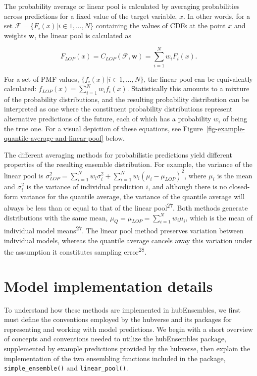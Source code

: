 \documentclass[
  letterpaper,
  DIV=11,
  numbers=noendperiod]{scrartcl}
\begin{document}
The probability average or linear pool is calculated by averaging
probabilities across predictions for a fixed value of the target
variable, \(x\). In other words, for a set
\(\mathcal{F} = \{F_i(x)| i \in 1,...,N \}\) containing the values of
CDFs at the point \(x\) and weights \(\pmb{w}\), the linear pool is
calculated as

\[
F_{LOP}(x) = C_{LOP}(\mathcal{F}, \pmb{w}) = \sum_{i = 1}^Nw_iF_i(x). 
\]

For a set of PMF values, \(\{f_i(x)|i \in 1, ..., N\}\), the linear pool
can be equivalently calculated:
\(f_{LOP}(x) = \sum_{i = 1}^N w_i f_i(x)\). Statistically this amounts
to a mixture of the probability distributions, and the resulting
probability distribution can be interpreted as one where the constituent
probability distributions represent alternative predictions of the
future, each of which has a probability \(w_i\) of being the true one.
For a visual depiction of these equations, see
Figure~\ref{fig-example-quantile-average-and-linear-pool} below.

The different averaging methods for probabilistic predictions yield
different properties of the resulting ensemble distribution. For
example, the variance of the linear pool is
\(\sigma^2_{LOP} = \sum_{i=1}^Nw_i\sigma_i^2 + \sum_{i=1}^Nw_i(\mu_i-\mu_{LOP})^2\),
where \(\mu_i\) is the mean and \(\sigma^2_i\) is the variance of
individual prediction \(i\), and although there is no closed-form
variance for the quantile average, the variance of the quantile average
will always be less than or equal to that of the linear
pool\textsuperscript{27}. Both methods generate distributions with the
same mean, \(\mu_Q = \mu_{LOP} = \sum_{i=1}^Nw_i\mu_i\), which is the
mean of individual model means\textsuperscript{27}. The linear pool
method preserves variation between individual models, whereas the
quantile average cancels away this variation under the assumption it
constitutes sampling error\textsuperscript{28}.

\section{Model implementation details}\label{sec-implementation}

To understand how these methods are implemented in {hubEnsembles}, we
first must define the conventions employed by the hubverse and its
packages for representing and working with model predictions. We begin
with a short overview of concepts and conventions needed to utilize the
{hubEnsembles} package, supplemented by example predictions provided by
the hubverse, then explain the implementation of the two ensembling
functions included in the package, \texttt{simple\_ensemble()} and
\texttt{linear\_pool()}.
\end{document}
